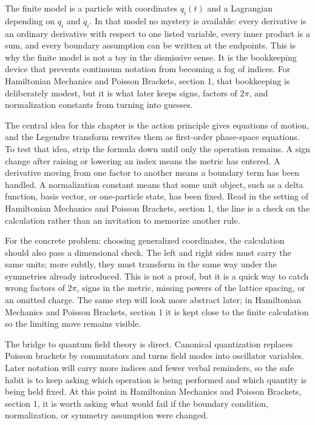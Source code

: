 The finite model is a particle with coordinates \(q_i(t)\) and a Lagrangian depending on \(q_i\) and \(\dot q_i\).  In that model no mystery is available: every derivative is an ordinary derivative with respect to one listed variable, every inner product is a sum, and every boundary assumption can be written at the endpoints.  This is why the finite model is not a toy in the dismissive sense.  It is the bookkeeping device that prevents continuum notation from becoming a fog of indices.  For Hamiltonian Mechanics and Poisson Brackets, section 1, that bookkeeping is deliberately modest, but it is what later keeps signs, factors of \(2\pi\), and normalization constants from turning into guesses.

The central idea for this chapter is the action principle gives equations of motion, and the Legendre transform rewrites them as first-order phase-space equations.  To test that idea, strip the formula down until only the operation remains.  A sign change after raising or lowering an index means the metric has entered.  A derivative moving from one factor to another means a boundary term has been handled.  A normalization constant means that some unit object, such as a delta function, basis vector, or one-particle state, has been fixed.  Read in the setting of Hamiltonian Mechanics and Poisson Brackets, section 1, the line is a check on the calculation rather than an invitation to memorize another rule.

For the concrete problem: choosing generalized coordinates, the calculation should also pass a dimensional check.  The left and right sides must carry the same units; more subtly, they must transform in the same way under the symmetries already introduced.  This is not a proof, but it is a quick way to catch wrong factors of \(2\pi\), signs in the metric, missing powers of the lattice spacing, or an omitted charge.  The same step will look more abstract later; in Hamiltonian Mechanics and Poisson Brackets, section 1 it is kept close to the finite calculation so the limiting move remains visible.

The bridge to quantum field theory is direct.  Canonical quantization replaces Poisson brackets by commutators and turns field modes into oscillator variables.  Later notation will carry more indices and fewer verbal reminders, so the safe habit is to keep asking which operation is being performed and which quantity is being held fixed.  At this point in Hamiltonian Mechanics and Poisson Brackets, section 1, it is worth asking what would fail if the boundary condition, normalization, or symmetry assumption were changed.

